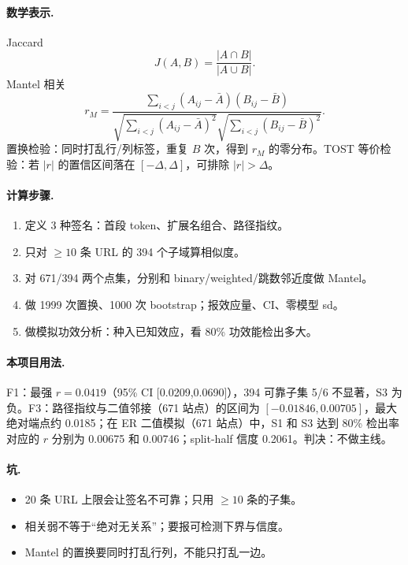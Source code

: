 \paragraph{数学表示.}
Jaccard
\[
J(A,B)=\frac{|A\cap B|}{|A\cup B|}.
\]
Mantel 相关
\[
r_M=\frac{\sum_{i<j}(A_{ij}-\bar A)(B_{ij}-\bar B)}
{\sqrt{\sum_{i<j}(A_{ij}-\bar A)^2}\sqrt{\sum_{i<j}(B_{ij}-\bar B)^2}}.
\]
置换检验：同时打乱行/列标签，重复 \(B\) 次，得到 \(r_M\) 的零分布。TOST 等价检验：若 \(|r|\) 的置信区间落在 \([-\Delta,\Delta]\)，可排除 \(|r|>\Delta\)。

\paragraph{计算步骤.}
\begin{enumerate}
  \item 定义 3 种签名：首段 token、扩展名组合、路径指纹。
  \item 只对 \(\ge10\) 条 URL 的 394 个子域算相似度。
  \item 对 671/394 两个点集，分别和 binary/weighted/跳数邻近度做 Mantel。
  \item 做 1999 次置换、1000 次 bootstrap；报效应量、CI、零模型 sd。
  \item 做模拟功效分析：种入已知效应，看 80\% 功效能检出多大。
\end{enumerate}

\paragraph{本项目用法.}
\unit{F1}：最强 \(r=0.0419\)（95\% CI [0.0209,0.0690]），394 可靠子集 5/6 不显著，S3 为负。\unit{F3}：路径指纹与二值邻接（671 站点）的区间为 \([-0.01846,0.00705]\)，最大绝对端点约 0.0185；在 ER 二值模拟（671 站点）中，S1 和 S3 达到 80\% 检出率对应的 \(r\) 分别为 0.00675 和 0.00746；split-half 信度 0.2061。判决：不做主线。

\paragraph{坑.}
\begin{itemize}
  \item 20 条 URL 上限会让签名不可靠；只用 \(\ge10\) 条的子集。
  \item 相关弱不等于“绝对无关系”；要报可检测下界与信度。
  \item Mantel 的置换要同时打乱行列，不能只打乱一边。
\end{itemize}

